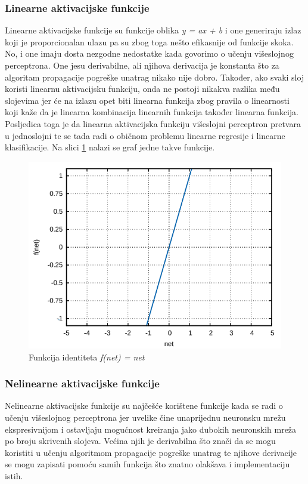 \documentclass[times, utf8, zavrsni]{fer}
\begin{document}
\subsubsection{Linearne aktivacijske funkcije}
Linearne aktivacijske funkcije su funkcije oblika \textit{y = ax + b} i one generiraju izlaz koji je proporcionalan ulazu pa su zbog toga nešto efikasnije od funkcije skoka. No, i one imaju dosta nezgodne nedostatke kada govorimo o učenju višeslojnog perceptrona. One jesu derivabilne, ali njihova derivacija je konstanta što za algoritam propagacije pogreške unatrag nikako nije dobro. Također, ako svaki sloj koristi linearnu aktivacijsku funkciju, onda ne postoji nikakva razlika među slojevima jer će na izlazu opet biti linearna funkcija zbog pravila o linearnosti koji kaže da je linearna kombinacija linearnih funkcija također linearna funkcija. Posljedica toga je da linearna aktivacijska funkciju višeslojni perceptron pretvara u jednoslojni te se tada radi o običnom problemu linearne regresije i linearne klasifikacije. Na slici \ref{fig:id-fun} nalazi se graf jedne takve funkcije.

\begin{figure}[H]
    \centering
    \includegraphics[scale=0.5]{img/id-fun.png}
    \caption[Caption for LOF]{Funkcija identiteta \textit{f(net) = net}\footnotemark}
    \label{fig:id-fun}
\end{figure}

\subsubsection{Nelinearne aktivacijske funkcije}
Nelinearne aktivacijske funkcije su najčešće korištene funkcije kada se radi o učenju višeslojnog perceptrona jer uvelike čine unaprijednu neuronsku mrežu ekspresivnijom i ostavljaju mogućnost kreiranja jako dubokih neuronskih mreža po broju skrivenih slojeva. Većina njih je derivabilna što znači da se mogu koristiti u učenju algoritmom propagacije pogreške unatrag te njihove derivacije se mogu zapisati pomoću samih funkcija što znatno olakšava i implementaciju istih.
\end{document}
